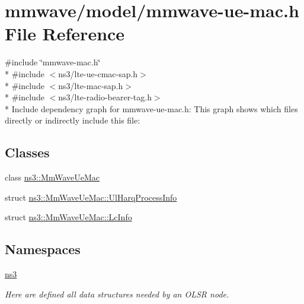 \hypertarget{mmwave-ue-mac_8h}{}\section{mmwave/model/mmwave-\/ue-\/mac.h File Reference}
\label{mmwave-ue-mac_8h}
{\ttfamily \#include \char`\"{}mmwave-\/mac.\+h\char`\"{}}\\*
{\ttfamily \#include $<$ns3/lte-\/ue-\/cmac-\/sap.\+h$>$}\\*
{\ttfamily \#include $<$ns3/lte-\/mac-\/sap.\+h$>$}\\*
{\ttfamily \#include $<$ns3/lte-\/radio-\/bearer-\/tag.\+h$>$}\\*
Include dependency graph for mmwave-\/ue-\/mac.h\+:
This graph shows which files directly or indirectly include this file\+:
\subsection*{Classes}
\begin{DoxyCompactItemize}
\item 
class \hyperlink{classns3_1_1MmWaveUeMac}{ns3\+::\+Mm\+Wave\+Ue\+Mac}
\item 
struct \hyperlink{structns3_1_1MmWaveUeMac_1_1UlHarqProcessInfo}{ns3\+::\+Mm\+Wave\+Ue\+Mac\+::\+Ul\+Harq\+Process\+Info}
\item 
struct \hyperlink{structns3_1_1MmWaveUeMac_1_1LcInfo}{ns3\+::\+Mm\+Wave\+Ue\+Mac\+::\+Lc\+Info}
\end{DoxyCompactItemize}
\subsection*{Namespaces}
\begin{DoxyCompactItemize}
\item 
 \hyperlink{namespacens3}{ns3}
\begin{DoxyCompactList}\small\item\em Here are defined all data structures needed by an O\+L\+SR node. \end{DoxyCompactList}\end{DoxyCompactItemize}
